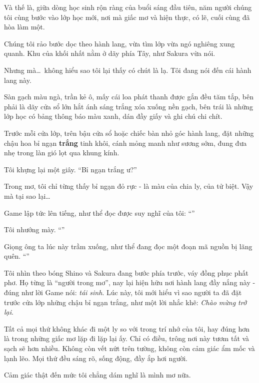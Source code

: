 \documentclass[../main.tex]{subfiles}
\begin{document}
Và thế là, giữa dòng học sinh rộn ràng của buổi sáng đầu tiên, năm người chúng tôi cùng bước vào lớp học mới, nơi mà giấc mơ và hiện thực, có lẽ, cuối cùng đã hòa làm một.

\ct

Chúng tôi rảo bước dọc theo hành lang, vừa tìm lớp vừa ngó nghiêng xung quanh. Khu của khối nhất nằm ở dãy phía Tây, như Sakura vừa nói.

Nhưng mà\dots\ không hiểu sao tôi lại thấy có chút là lạ. Tôi đang nói đến cái hành lang này.

Sàn gạch màu ngà, trần kẻ ô, mấy cái loa phát thanh được gắn đều tăm tắp, bên phải là dãy cửa sổ lớn hắt ánh sáng trắng xóa xuống nền gạch, bên trái là những lớp học có bảng thông báo màu xanh, dán đầy giấy và ghi chú chi chít.

Trước mỗi cửa lớp, trên bậu cửa sổ hoặc chiếc bàn nhỏ góc hành lang, đặt những chậu hoa bỉ ngạn \textbf{trắng} tinh khôi, cánh mỏng manh như sương sớm, đung đưa nhẹ trong làn gió lọt qua khung kính.


Tôi khựng lại một giây. ``Bỉ ngạn trắng ư?''

Trong mơ, tôi chỉ từng thấy bỉ ngạn đỏ rực - là màu của chia ly, của tử biệt. Vậy mà tại sao lại\dots

Game lập tức lên tiếng, như thể đọc được suy nghĩ của tôi: ``''

Tôi nhướng mày. ``''

Giọng ông ta lúc này trầm xuống, như thể đang đọc một đoạn mã nguồn bị lãng quên. ``''

Tôi nhìn theo bóng Shino và Sakura đang bước phía trước, váy đồng phục phất phơ. Họ từng là ``người trong mơ'', nay lại hiện hữu nơi hành lang đầy nắng này - đúng như lời Game nói: \textit{tái sinh}. Lúc này, tôi mới hiểu vì sao người ta đã đặt trước cửa lớp những chậu bỉ ngạn trắng, như một lời nhắc khẽ: \textit{Chào mừng trở lại}.

Tất cả mọi thứ không khác đi một ly so với trong trí nhớ của tôi, hay đúng hơn là trong những giấc mơ lặp đi lặp lại ấy. Chỉ có điều, trông nơi này tươm tất và sạch sẽ hơn nhiều. Không còn vết nứt trên tường, không còn cảm giác ẩm mốc và lạnh lẽo. Mọi thứ đều sáng rõ, sống động, đầy ắp hơi người.

Cảm giác thật đến mức tôi chẳng dám nghĩ là mình mơ nữa.
\end{document}
